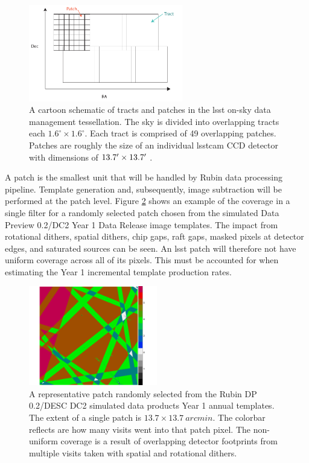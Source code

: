 \documentclass[preprintm,linenumbers]{aastex631}
\begin{document}
	\begin{figure}
		\centering
		\includegraphics[width=0.6\textwidth]{results/tracts_and_patches.pdf} 
		
		\caption{A cartoon schematic of tracts and patches in the \gls*{lsst} on-sky data management tessellation.
  The sky is divided into overlapping tracts each $1.6^{\circ} \times 1.6^{\circ}$. 
  Each tract is comprised of 49 overlapping patches. 
  Patches are roughly the size of an individual \gls*{lsstcam} CCD detector with dimensions of $13.7\mbox{$^\prime$} \times 13.7\mbox{$^\prime$}$ . }
		
		\label{fig:tractsandpatches}
	\end{figure}
	
	A patch is the smallest unit that will be handled by Rubin data processing pipeline. 
 Template generation and, subsequently, image subtraction will be performed at the patch level. 
 Figure \ref{fig:randompatch} shows an example of the coverage in a single filter for a randomly selected patch chosen from the simulated Data Preview 0.2/DC2 \citep{2021ApJS..253...31L}  Year 1 Data Release image templates. 
 The impact from rotational dithers, spatial dithers, chip gaps, raft gaps, masked pixels at detector edges, and saturated sources can be seen. An \gls*{lsst} patch will therefore not have uniform coverage across all of its pixels. This must be accounted for when estimating the Year 1 incremental template production rates. 
	
	\begin{figure}
		\centering
		\includegraphics[width=0.5\textwidth]{results/dc2-random_single_patch_year1_coadd_depth.pdf} 
		
		\caption{A representative patch randomly selected from the Rubin DP 0.2/DESC DC2  \citep{2021ApJS..253...31L} simulated data products Year 1 annual templates. 
			The extent of a single patch is $13.7 \times 13.7\ \si{arcmin}$.
			The colorbar reflects are how many visits went into that patch pixel.
   The non-uniform coverage is a result of  overlapping detector footprints from multiple visits taken with spatial and rotational dithers.}
		
		\label{fig:randompatch}
	\end{figure}
	
\end{document}
